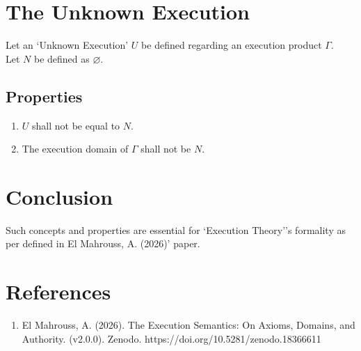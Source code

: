 \documentclass[11pt,a4paper]{article}
\begin{document}
\section{The Unknown Execution}

Let an `Unknown Execution' $U$ be defined regarding an execution product $\Gamma$. \\
Let $N$ be defined as $\varnothing$.

\subsection{Properties}

\begin{enumerate}

    \item $U$ shall not be equal to $N$.
    \item The execution domain of $\Gamma$ shall not be $N$.

\end{enumerate}

\section{Conclusion}

Such concepts and properties are essential for `Execution Theory''s formality as per defined in El Mahrouss, A. (2026)' paper.

\section{References}

\begin{enumerate}
    \item El Mahrouss, A. (2026). The Execution Semantics: On Axioms, Domains, and Authority. (v2.0.0). Zenodo. https://doi.org/10.5281/zenodo.18366611
\end{enumerate}
\end{document}
